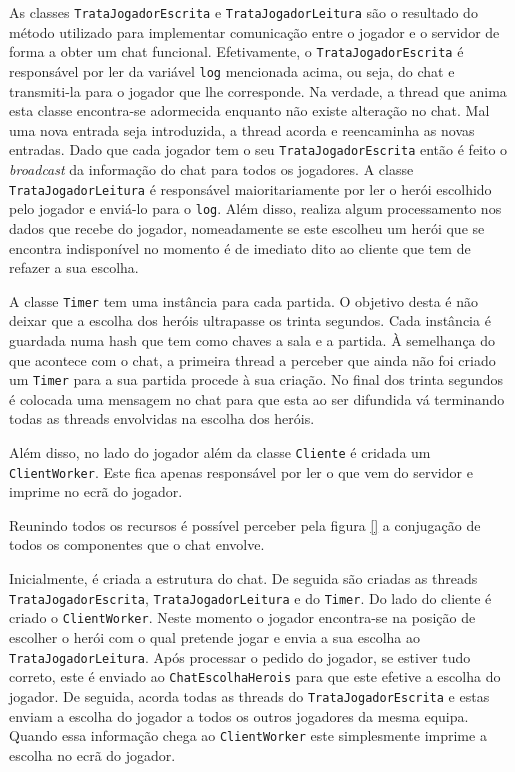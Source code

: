 \documentclass[a4paper]{article}
\begin{document}
As classes \texttt{TrataJogadorEscrita} e \texttt{TrataJogadorLeitura} são o resultado do método utilizado para implementar comunicação entre o jogador e o servidor de forma a obter um chat funcional. Efetivamente, o \texttt{TrataJogadorEscrita} é responsável por ler da variável \texttt{log} mencionada acima, ou seja, do chat e transmiti-la para o jogador que lhe corresponde. Na verdade, a thread que anima esta classe encontra-se adormecida enquanto não existe alteração no chat. Mal uma nova entrada seja introduzida, a thread acorda e reencaminha as novas entradas. Dado que cada jogador tem o seu \texttt{TrataJogadorEscrita} então é feito o \textit{broadcast} da informação do chat para todos os jogadores. A classe \texttt{TrataJogadorLeitura} é responsável maioritariamente por ler o herói escolhido pelo jogador e enviá-lo para o \texttt{log}. Além disso, realiza algum processamento nos dados que recebe do jogador, nomeadamente se este escolheu um herói que se encontra indisponível no momento é de imediato dito ao cliente que tem de refazer a sua escolha.

A classe \texttt{Timer} tem uma instância para cada partida. O objetivo desta é não deixar que a escolha dos heróis ultrapasse os trinta segundos. Cada instância é guardada numa hash que tem como chaves a sala e a partida. À semelhança do que acontece com o chat, a primeira thread a perceber que ainda não foi criado um \texttt{Timer} para a sua partida procede à sua criação. No final dos trinta segundos é colocada uma mensagem no chat para que esta ao ser difundida vá terminando todas as threads envolvidas na escolha dos heróis.

Além disso, no lado do jogador além da classe \texttt{Cliente} é cridada um \texttt{ClientWorker}. Este fica apenas responsável por ler o que vem do servidor e imprime no ecrã do jogador.

Reunindo todos os recursos é possível perceber pela figura \ref{} a conjugação de todos os componentes que o chat envolve. 

Inicialmente, é criada a estrutura do chat. De seguida são criadas as threads \texttt{TrataJogadorEscrita}, \texttt{TrataJogadorLeitura} e do \texttt{Timer}. Do lado do cliente é criado o \texttt{ClientWorker}. Neste momento o jogador encontra-se na posição de escolher o herói com o qual pretende jogar e envia a sua escolha ao \texttt{TrataJogadorLeitura}. Após processar o pedido do jogador, se estiver tudo correto, este é enviado ao \texttt{ChatEscolhaHerois} para que este efetive a escolha do jogador. De seguida, acorda todas as threads do \texttt{TrataJogadorEscrita} e estas enviam a escolha do jogador a todos os outros jogadores da mesma equipa. Quando essa informação chega ao \texttt{ClientWorker} este simplesmente imprime a escolha no ecrã do jogador.
\end{document}

